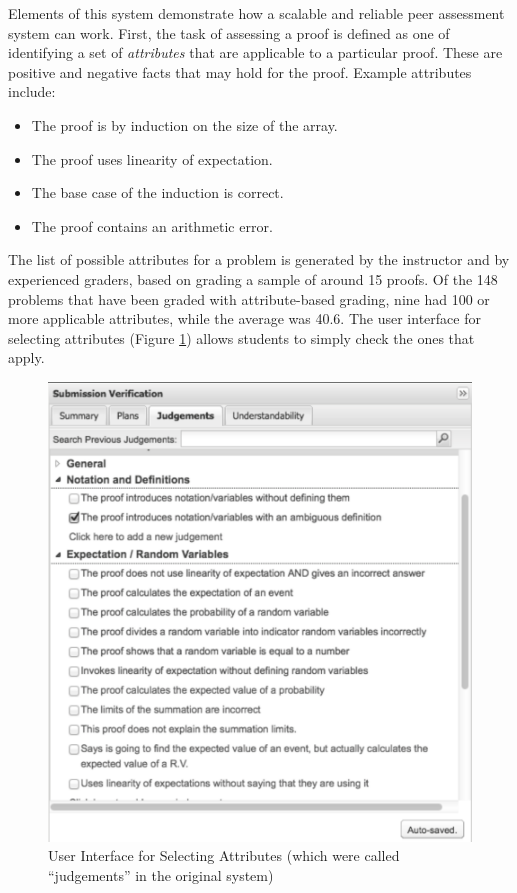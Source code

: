 \documentclass[12pt]{article}
\begin{document}
Elements of this system demonstrate 
how a scalable and reliable peer assessment system can work.  First,
the task of assessing a proof is defined as one of identifying a set of
{\em attributes} that are applicable to a particular proof.  These are
positive and negative facts that may hold for the proof.  Example
attributes include:
\begin{itemize}
\item The proof is by induction on the size of the array.
\item The proof uses linearity of expectation.
\item The base case of the induction is correct.
\item The proof contains an arithmetic error.
\end{itemize}

The list of possible attributes for a problem is generated by the
instructor and by experienced graders, based on grading a sample of
around 15 proofs.  Of the 148 problems that have been graded with
attribute-based grading, nine had 100 or more applicable attributes,
while the average was 40.6. The user interface for selecting attributes 
(Figure \ref{fig:verifications}) allows students to simply check the ones 
that apply.

\begin{figure}
\begin{center}
\includegraphics[scale=0.45]{list_verifications}
\end{center}
\caption{User Interface for Selecting Attributes (which were called ``judgements'' in the original system)}
\label{fig:verifications}
\end{figure}
\end{document}
